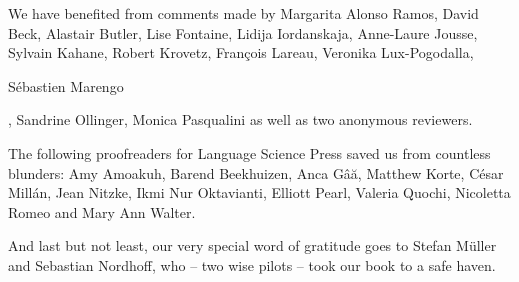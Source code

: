 We have benefited from comments made by Margarita Alonso Ramos, David Beck, Alastair Butler, Lise Fontaine, Lidija Iordanskaja, Anne-Laure Jousse, Sylvain Kahane, Robert Krovetz, François Lareau, Veronika Lux-Pogodalla, \begin{otherlanguage}{french}Sébastien Marengo\end{otherlanguage}, Sandrine Ollinger, Monica Pasqualini as well as two anonymous reviewers.

The following proofreaders for Language Science Press saved us from countless blunders: Amy Amoakuh, 
Barend Beekhuizen, Anca G\^{a}\u{a}, Matthew Korte, César Millán, Jean Nitzke, Ikmi Nur Oktavianti,
Elliott Pearl, Valeria Quochi, Nicoletta Romeo and Mary Ann Walter.

And last but not least, our very special word of gratitude goes to Stefan Müller and Sebastian Nordhoff, who -- two wise pilots -- took our book to a safe haven.

\clearpage{\pagestyle{empty}\cleardoublepage}

